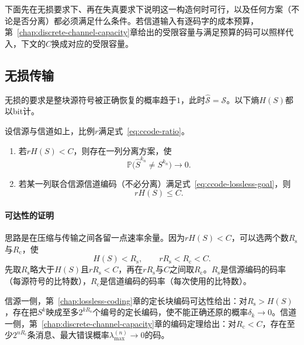 下面先在无损要求下、再在失真要求下说明这一构造何时可行，以及任何方案（不论是否分离）都必须满足什么条件。若信道输入有逐码字的成本预算，第~\ref{chap:discrete-channel-capacity}章给出的受限容量与满足预算的码可以照样代入，下文的$C$换成对应的受限容量。

\subsection{无损传输}
\label{sec:ccode-lossless-transmission}

无损的要求是整块源符号被正确恢复的概率趋于$1$，此时$\hat{\mathcal{S}}=\mathcal{S}$。以下熵$H(S)$都以bit计。

\begin{theorem}[无损传输的分离定理]
\label{thm:ccode-lossless-separation}
设信源与信道如上，比例$r$满足式~\eqref{eq:ccode-ratio}。
\begin{enumerate}
 \item 若$rH(S)<C$，则存在一列分离方案，使
 \begin{equation}
  \mathbb{P}\bigl(\hat{S}^{k_n}\neq S^{k_n}\bigr)\to0 .
  \label{eq:ccode-lossless-goal}
 \end{equation}
 \item 若某一列联合信源信道编码（不必分离）满足式~\eqref{eq:ccode-lossless-goal}，则
 \begin{equation}
  rH(S)\leq C .
  \label{eq:ccode-lossless-converse}
 \end{equation}
\end{enumerate}
\end{theorem}

\paragraph{可达性的证明}
思路是在压缩与传输之间各留一点速率余量。因为$rH(S)<C$，可以选两个数$R_{\mathrm{s}}$与$R_{\mathrm{c}}$，使
\[
 H(S)<R_{\mathrm{s}},\qquad rR_{\mathrm{s}}<R_{\mathrm{c}}<C .
\]
先取$R_{\mathrm{s}}$略大于$H(S)$且$rR_{\mathrm{s}}<C$，再在$rR_{\mathrm{s}}$与$C$之间取$R_{\mathrm{c}}$。$R_{\mathrm{s}}$是信源编码的码率（每源符号的比特数），$R_{\mathrm{c}}$是信道编码的码率（每次使用的比特数）。

信源一侧，第~\ref{chap:lossless-coding}章的定长块编码可达性给出：对$R_{\mathrm{s}}>H(S)$，存在把$S^{k}$映成至多$2^{kR_{\mathrm{s}}}$个编号的定长编码，使不能正确还原的概率$\delta_k\to0$。信道一侧，第~\ref{chap:discrete-channel-capacity}章的编码定理给出：对$R_{\mathrm{c}}<C$，存在至少$2^{nR_{\mathrm{c}}}$条消息、最大错误概率$\lambda_{\max}^{(n)}\to0$的码。

